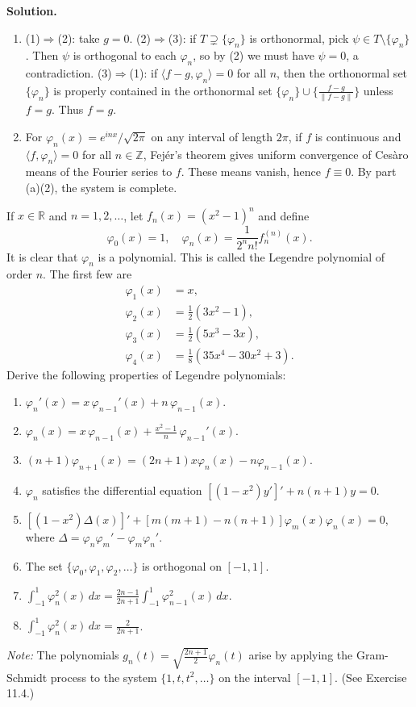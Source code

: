 \noindent\textbf{Solution.}
\begin{enumerate}[label=(\alph*)]
\item (1)$\Rightarrow$(2): take $g=0$. (2)$\Rightarrow$(3): if $T\supsetneq\{\varphi_n\}$ is orthonormal, pick $\psi\in T\setminus\{\varphi_n\}$. Then $\psi$ is orthogonal to each $\varphi_n$, so by (2) we must have $\psi=0$, a contradiction. (3)$\Rightarrow$(1): if $\langle f- g,\varphi_n\rangle=0$ for all $n$, then the orthonormal set $\{\varphi_n\}$ is properly contained in the orthonormal set $\{\varphi_n\}\cup\{\tfrac{f-g}{\|f-g\|}\}$ unless $f=g$. Thus $f=g$.
\item For $\varphi_n(x)=e^{inx}/\sqrt{2\pi}$ on any interval of length $2\pi$, if $f$ is continuous and $\langle f,\varphi_n\rangle=0$ for all $n\in\mathbb Z$, Fejér's theorem gives uniform convergence of Cesàro means of the Fourier series to $f$. These means vanish, hence $f\equiv 0$. By part (a)(2), the system is complete.
\end{enumerate}

\begin{problembox}
If $x \in \mathbb{R}$ and $n = 1, 2, \dots$, let $f_n(x) = (x^2 - 1)^n$ and define
\[
\varphi_0(x) = 1, \quad \varphi_n(x) = \frac{1}{2^{n}n!} f_n^{(n)}(x).
\]
It is clear that $\varphi_n$ is a polynomial. This is called the Legendre polynomial of order $n$. The first few are
\[
\begin{aligned}
\varphi_1(x) &= x, \\
\varphi_2(x) &= \frac{1}{2}(3x^2 - 1), \\
\varphi_3(x) &= \frac{1}{2}(5x^3 - 3x), \\
\varphi_4(x) &= \frac{1}{8}(35x^4 - 30x^2 + 3).
\end{aligned}
\]
Derive the following properties of Legendre polynomials:
\begin{enumerate}[label=(\alph*)]
\item $\varphi_n'(x) = x \, \varphi_{n-1}'(x) + n \, \varphi_{n-1}(x)$.
\item $\varphi_n(x) = x \, \varphi_{n-1}(x) + \frac{x^2 - 1}{n} \, \varphi_{n-1}'(x)$.
\item $(n + 1) \varphi_{n+1}(x) = (2n + 1) x \varphi_n(x) - n \varphi_{n-1}(x)$.
\item $\varphi_n$ satisfies the differential equation $[(1 - x^2) y']' + n(n + 1) y = 0$.
\item $[(1 - x^2) \Delta(x)]' + [m(m + 1) - n(n + 1)] \varphi_m(x) \varphi_n(x) = 0$, where $\Delta = \varphi_n \varphi_m' - \varphi_m \varphi_n'$.
\item The set $\{\varphi_0, \varphi_1, \varphi_2, \dots\}$ is orthogonal on $[-1, 1]$.
\item $\int_{-1}^1 \varphi_n^2(x) \, dx = \frac{2n - 1}{2n + 1} \int_{-1}^1 \varphi_{n-1}^2(x) \, dx$.
\item $\int_{-1}^1 \varphi_n^2(x)\, dx = \frac{2}{2n+1}$.
\end{enumerate}
\textit{Note:} The polynomials $g_n(t) = \sqrt{\frac{2n + 1}{2}} \varphi_n(t)$ arise by applying the Gram-Schmidt process to the system $\{1, t, t^2, \dots\}$ on the interval $[-1, 1]$. (See Exercise 11.4.)
\end{problembox}

